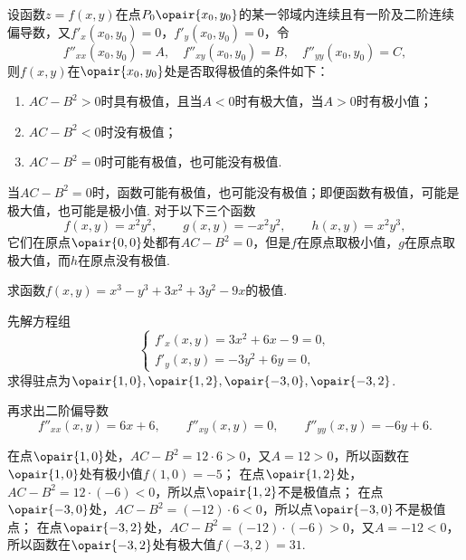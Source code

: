 \begin{theorem}[充分条件]\label{theorem:多元函数微分法.多元函数极值存在的充分条件}
设函数\(z=f(x,y)\)在点\(P_0\opair{x_0,y_0}\)的某一邻域内连续且有一阶及二阶连续偏导数，又\(f'_x(x_0,y_0)=0\)，\(f'_y(x_0,y_0)=0\)，令\[
f''_{xx}(x_0,y_0)=A, \quad
f''_{xy}(x_0,y_0)=B, \quad
f''_{yy}(x_0,y_0)=C,
\]则\(f(x,y)\)在\(\opair{x_0,y_0}\)处是否取得极值的条件如下：
\begin{enumerate}
\item \(AC-B^2>0\)时具有极值，且当\(A<0\)时有极大值，当\(A>0\)时有极小值；
\item \(AC-B^2<0\)时没有极值；
\item \(AC-B^2=0\)时可能有极值，也可能没有极值.
\end{enumerate}
\end{theorem}

\begin{example}
当\(AC-B^2=0\)时，函数可能有极值，也可能没有极值；即便函数有极值，可能是极大值，也可能是极小值.
对于以下三个函数\[
f(x,y) = x^2 y^2,
\qquad
g(x,y) = -x^2 y^2,
\qquad
h(x,y) = x^2 y^3,
\]它们在原点\(\opair{0,0}\)处都有\(AC-B^2=0\)，但是\(f\)在原点取极小值，\(g\)在原点取极大值，而\(h\)在原点没有极值.
\end{example}

\begin{example}
求函数\(f(x,y) = x^3-y^3+3x^2+3y^2-9x\)的极值.
\begin{solution}
先解方程组\[
\left\{ \begin{array}{l}
f'_x(x,y) = 3x^2+6x-9 = 0, \\
f'_y(x,y) = -3y^2+6y = 0,
\end{array} \right.
\]求得驻点为\(\opair{1,0},\opair{1,2},\opair{-3,0},\opair{-3,2}\).

再求出二阶偏导数\[
f''_{xx}(x,y) = 6x+6,
\qquad
f''_{xy}(x,y) = 0,
\qquad
f''_{yy}(x,y) = -6y+6.
\]

在点\(\opair{1,0}\)处，\(AC-B^2=12\cdot6>0\)，又\(A=12>0\)，所以函数在\(\opair{1,0}\)处有极小值\(f(1,0)=-5\)；
在点\(\opair{1,2}\)处，\(AC-B^2=12\cdot(-6)<0\)，所以点\(\opair{1,2}\)不是极值点；
在点\(\opair{-3,0}\)处，\(AC-B^2=(-12)\cdot6<0\)，所以点\(\opair{-3,0}\)不是极值点；
在点\(\opair{-3,2}\)处，\(AC-B^2=(-12)\cdot(-6)>0\)，又\(A=-12<0\)，所以函数在\(\opair{-3,2}\)处有极大值\(f(-3,2)=31\).
\end{solution}
\end{example}

